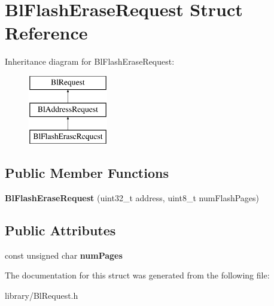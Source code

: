 \hypertarget{struct_bl_flash_erase_request}{\section{Bl\-Flash\-Erase\-Request Struct Reference}
\label{struct_bl_flash_erase_request}
}
Inheritance diagram for Bl\-Flash\-Erase\-Request\-:\begin{figure}[H]
\begin{center}
\leavevmode
\includegraphics[height=3.000000cm]{struct_bl_flash_erase_request}
\end{center}
\end{figure}
\subsection*{Public Member Functions}
\begin{DoxyCompactItemize}
\item 
\hypertarget{struct_bl_flash_erase_request_aea945f360bd7e53e625a9235071599d8}{{\bfseries Bl\-Flash\-Erase\-Request} (uint32\-\_\-t address, uint8\-\_\-t num\-Flash\-Pages)}\label{struct_bl_flash_erase_request_aea945f360bd7e53e625a9235071599d8}

\end{DoxyCompactItemize}
\subsection*{Public Attributes}
\begin{DoxyCompactItemize}
\item 
\hypertarget{struct_bl_flash_erase_request_aa7440aea6fb9fa10b4685195b8d6f433}{const unsigned char {\bfseries num\-Pages}}\label{struct_bl_flash_erase_request_aa7440aea6fb9fa10b4685195b8d6f433}

\end{DoxyCompactItemize}


The documentation for this struct was generated from the following file\-:\begin{DoxyCompactItemize}
\item 
library/Bl\-Request.\-h\end{DoxyCompactItemize}
